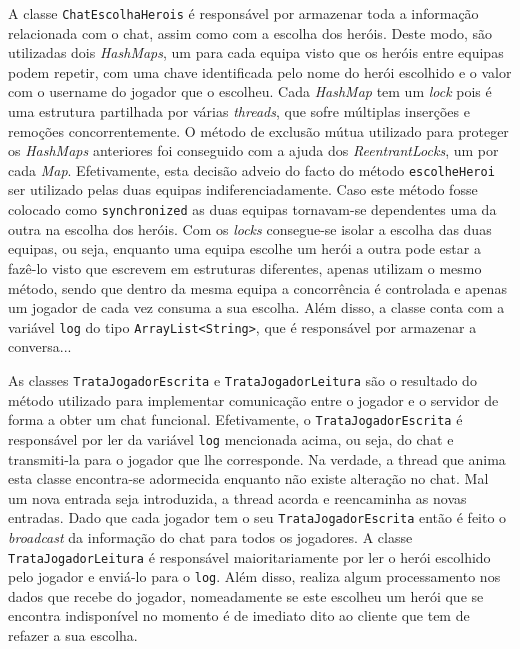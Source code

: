 \documentclass[a4paper]{article}
\begin{document}
A classe \texttt{ChatEscolhaHerois} é responsável por armazenar toda a informação relacionada com o chat, assim como com a escolha dos heróis. Deste modo, são utilizadas dois \textit{HashMaps}, um para cada equipa visto que os heróis entre equipas podem repetir, com uma chave identificada pelo nome do herói escolhido e o valor com o username do jogador que o escolheu. Cada \textit{HashMap} tem um \textit{lock} pois é uma estrutura partilhada por várias \textit{threads}, que sofre múltiplas inserções e remoções concorrentemente. O método de exclusão mútua utilizado para proteger os \textit{HashMaps} anteriores foi conseguido com a ajuda dos \textit{ReentrantLocks}, um por cada \textit{Map}. Efetivamente, esta decisão adveio do facto do método \texttt{escolheHeroi} ser utilizado pelas duas equipas indiferenciadamente. Caso este método fosse colocado como \texttt{synchronized} as duas equipas tornavam-se dependentes uma da outra na escolha dos heróis. Com os \textit{locks} consegue-se isolar a escolha das duas equipas, ou seja, enquanto uma equipa escolhe um herói a outra pode estar a fazê-lo visto que escrevem em estruturas diferentes, apenas utilizam o mesmo método, sendo que dentro da mesma equipa a concorrência é controlada e apenas um jogador de cada vez consuma a sua escolha. 
Além disso, a classe conta com a variável \texttt{log} do tipo \texttt{ArrayList<String>}, que é responsável por armazenar a conversa...

As classes \texttt{TrataJogadorEscrita} e \texttt{TrataJogadorLeitura} são o resultado do método utilizado para implementar comunicação entre o jogador e o servidor de forma a obter um chat funcional. Efetivamente, o \texttt{TrataJogadorEscrita} é responsável por ler da variável \texttt{log} mencionada acima, ou seja, do chat e transmiti-la para o jogador que lhe corresponde. Na verdade, a thread que anima esta classe encontra-se adormecida enquanto não existe alteração no chat. Mal um nova entrada seja introduzida, a thread acorda e reencaminha as novas entradas. Dado que cada jogador tem o seu \texttt{TrataJogadorEscrita} então é feito o \textit{broadcast} da informação do chat para todos os jogadores. A classe \texttt{TrataJogadorLeitura} é responsável maioritariamente por ler o herói escolhido pelo jogador e enviá-lo para o \texttt{log}. Além disso, realiza algum processamento nos dados que recebe do jogador, nomeadamente se este escolheu um herói que se encontra indisponível no momento é de imediato dito ao cliente que tem de refazer a sua escolha.
\end{document}
